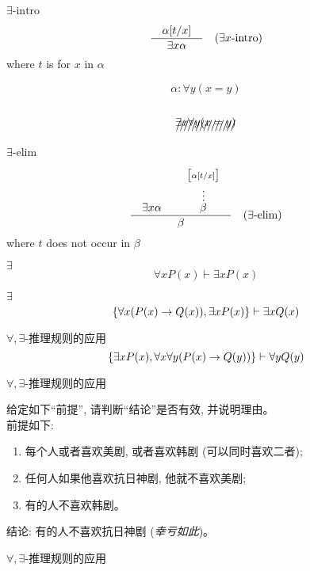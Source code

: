 \begin{frame}{$\exists\text{-intro}$}
  \begin{center}
    \[
      \frac{\quad\alpha[t/x]\quad}{\quad\exists x \alpha\quad} \quad (\exists x\text{-intro})
    \]
    where $t$ is  for $x$ in $\alpha$
  \end{center}

  \pause
  \[
    \alpha: \forall y (x = y)
  \]

  \pause
  \[
  \]

  \pause
  \[
    \xout{\exists x \forall y (x = y)}
  \]
\end{frame}

\begin{frame}{$\exists\text{-elim}$}
  \begin{center}
    \[
      \frac{\quad\exists x \alpha \qquad \stackrel{\big[\alpha[t/x]\big]}{\stackrel{\vdots}{\beta}}\quad}{\quad\beta\quad} \quad (\exists\text{-elim})
    \]
  where $t$ does not occur in $\beta$
  \end{center}
\end{frame}

\begin{frame}{$\exists$}
  \[
    \forall x P(x) \vdash \exists x P(x)
  \]
\end{frame}

\begin{frame}{$\exists$}
  \[
    \{\forall x (P(x) \to Q(x)), \exists x P(x)\} \vdash \exists x Q(x)
  \]
\end{frame}

\begin{frame}{$\forall, \exists$-推理规则的应用}
  \[
    \{\exists x P(x), \forall x \forall y (P(x) \to Q(y))\} \vdash \forall y Q(y)
  \]
\end{frame}

\begin{frame}{$\forall, \exists$-推理规则的应用}
  \begin{exampleblock}{}
    给定如下``前提'', 请判断``结论''是否有效, 并说明理由。\\
    前提如下:
    \begin{enumerate}[(1)]
      \item 每个人或者喜欢美剧, 或者喜欢韩剧 (可以同时喜欢二者);
      \item 任何人如果他喜欢抗日神剧, 他就不喜欢美剧;
      \item 有的人不喜欢韩剧。
    \end{enumerate}

    结论: 有的人不喜欢抗日神剧 (\emph{幸亏如此})。
  \end{exampleblock}
\end{frame}

\begin{frame}{$\forall, \exists$-推理规则的应用}
\end{frame}
